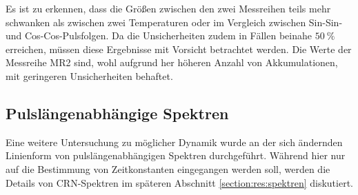 Es ist zu erkennen, dass die Größen zwischen den zwei Messreihen teils mehr schwanken als zwischen zwei Temperaturen oder im Vergleich zwischen Sin-Sin- und Cos-Cos-Pulsfolgen. Da die Unsicherheiten zudem in Fällen beinahe $\SI{50}{\percent}$ erreichen, müssen diese Ergebnisse mit Vorsicht betrachtet werden. Die Werte der Messreihe MR2 sind, wohl aufgrund her höheren Anzahl von Akkumulationen, mit geringeren Unsicherheiten behaftet.



\subsection{Pulslängenabhängige Spektren} \label{section:res:spekdyn}

Eine weitere Untersuchung zu möglicher Dynamik wurde an der sich ändernden Linienform von pulslängenabhängigen Spektren durchgeführt. Während hier nur auf die Bestimmung von Zeitkonstanten eingegangen werden soll, werden die Details von CRN-Spektren im späteren Abschnitt \ref{section:res:spektren} diskutiert.

